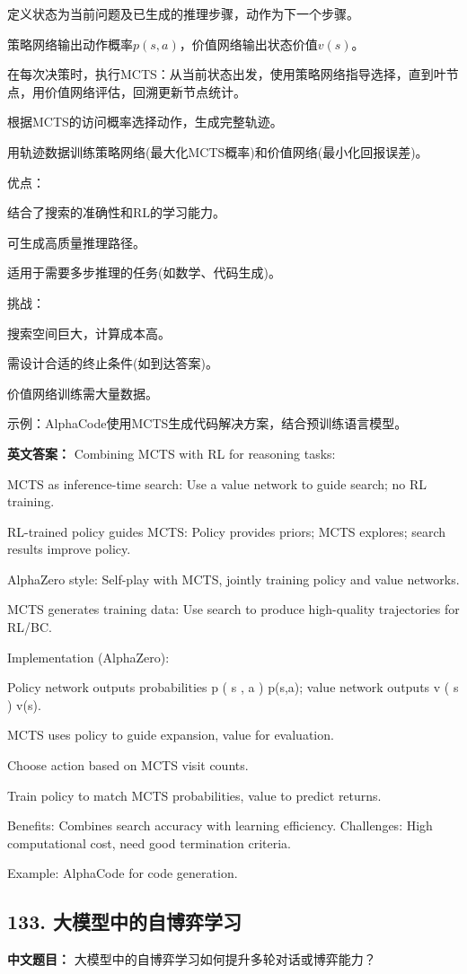 \documentclass[10pt,a4paper]{ctexart}
\begin{document}
定义状态为当前问题及已生成的推理步骤，动作为下一个步骤。

策略网络输出动作概率\(p(s,a)\)，价值网络输出状态价值\(v(s)\)。

在每次决策时，执行MCTS：从当前状态出发，使用策略网络指导选择，直到叶节点，用价值网络评估，回溯更新节点统计。

根据MCTS的访问概率选择动作，生成完整轨迹。

用轨迹数据训练策略网络(最大化MCTS概率)和价值网络(最小化回报误差)。

优点：

结合了搜索的准确性和RL的学习能力。

可生成高质量推理路径。

适用于需要多步推理的任务(如数学、代码生成)。

挑战：

搜索空间巨大，计算成本高。

需设计合适的终止条件(如到达答案)。

价值网络训练需大量数据。

示例：AlphaCode使用MCTS生成代码解决方案，结合预训练语言模型。

\textbf{英文答案：}
Combining MCTS with RL for reasoning tasks:

MCTS as inference-time search: Use a value network to guide search; no RL training.

RL-trained policy guides MCTS: Policy provides priors; MCTS explores; search results improve policy.

AlphaZero style: Self-play with MCTS, jointly training policy and value networks.

MCTS generates training data: Use search to produce high-quality trajectories for RL/BC.

Implementation (AlphaZero):

Policy network outputs probabilities 
p
(
s
,
a
)
p(s,a); value network outputs 
v
(
s
)
v(s).

MCTS uses policy to guide expansion, value for evaluation.

Choose action based on MCTS visit counts.

Train policy to match MCTS probabilities, value to predict returns.

Benefits: Combines search accuracy with learning efficiency.
Challenges: High computational cost, need good termination criteria.

Example: AlphaCode for code generation.

\subsection*{133. 大模型中的自博弈学习}
\textbf{中文题目：} 大模型中的自博弈学习如何提升多轮对话或博弈能力？
\end{document}
